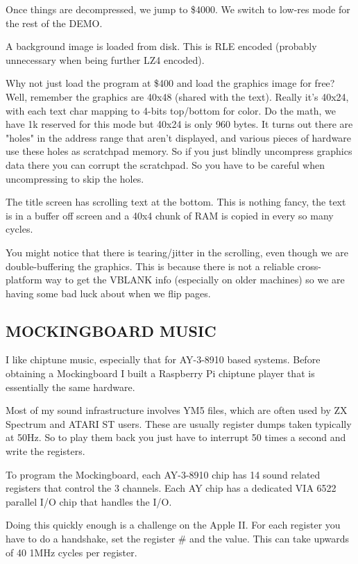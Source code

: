 \documentclass[twocolumn]{article}
\begin{document}
   Once things are decompressed, we jump to \$4000.  We switch to low-res
   mode for the rest of the DEMO.

   A background image is loaded from disk.  This is RLE encoded (probably
   unnecessary when being further LZ4 encoded).

   Why not just load the program at \$400 and load the graphics image for
   free?  Well, remember the graphics are 40x48 (shared with the text).
   Really it's 40x24, with each text char mapping to 4-bits top/bottom
   for color.  Do the math, we have 1k reserved for this mode but 40x24
   is only 960 bytes.  It turns out there are "holes" in the address range
   that aren't displayed, and various pieces of hardware use these holes
   as scratchpad memory.  So if you just blindly uncompress graphics data
   there you can corrupt the scratchpad.  So you have to be careful
   when uncompressing to skip the holes.

   The title screen has scrolling text at the bottom.  This is nothing fancy,
   the text is in a buffer off screen and a 40x4 chunk of RAM is copied in
   every so many cycles.

   You might notice that there is tearing/jitter in the scrolling, even
   though we are double-buffering the graphics.  This is because there is
   not a reliable cross-platform way to get the VBLANK info (especially
   on older machines) so we are having some bad luck about when we flip
   pages.

\subsection{MOCKINGBOARD MUSIC}

   I like chiptune music, especially that for AY-3-8910 based systems.
   Before obtaining a Mockingboard I built a Raspberry Pi chiptune player
   that is essentially the same hardware.

   Most of my sound infrastructure involves YM5 files, which are often used
   by ZX Spectrum and ATARI ST users.  These are usually register dumps
   taken typically at 50Hz.  So to play them back you just have to interrupt
   50 times a second and write the registers.

   To program the Mockingboard, each AY-3-8910 chip has 14 sound related
   registers that control the 3 channels.  Each AY chip has a dedicated
   VIA 6522 parallel I/O chip that handles the I/O.

   Doing this quickly enough is a challenge on the Apple II.  For each
   register you have to do a handshake, set the register \# and the value.
   This can take upwards of 40 1MHz cycles per register.
\end{document}
